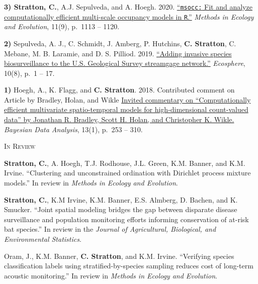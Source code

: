 \documentclass[a4paper]{article}
\newcommand{\subheader} [1] {
	{\hspace*{-9pt}\vspace*{6pt} \textsc{#1}}
	\vspace*{-6pt}
}
\begin{document}
\textbf{3) Stratton, C.}, A.J. Sepulveda, and A. Hoegh. 2020.
\href{https://doi.org/10.1111/2041-210X.13442}{``\texttt{msocc:} Fit and
analyze computationally efficient multi-scale occupancy models in
\texttt{R}.''} \textit{Methods in Ecology and Evolution}, 11(9), p.~1113
-- 1120. \vspace*{2mm}

\textbf{2)} Sepulveda, A. J., C. Schmidt, J. Amberg, P. Hutchins,
\textbf{C. Stratton}, C. Mebane, M. B. Laramie, and D. S. Pilliod. 2019.
\href{https://doi.org/10.1002/ecs2.2843}{``Adding invasive species
biosurveillance to the U.S. Geological Survey streamgage network.''}
\textit{Ecosphere}, 10(8), p.~1 -- 17. \vspace*{2mm}

\textbf{1)} Hoegh, A., K. Flagg, and \textbf{C. Stratton}. 2018.
Contributed comment on Article by Bradley, Holan, and Wikle
\href{https://eds.p.ebscohost.com/abstract?site=eds\&scope=site\&jrnl=19360975\&AN=138950462\&h=fupOc1pyeH8dv67mdPoRzhYvo96LS\%2bzCYNHIjAcMPojnVBydkua\%2fXFU6RanU78MDh8WNMlzPVI\%2fBxvaUiWvg\%2bw\%3d\%3d\&crl=c\&resultLocal=ErrCrlNoResults\&resultNs=Ehost\&crlhashurl=login.aspx\%3fdirect\%3dtrue\%26profile\%3dehost\%26scope\%3dsite\%26authtype\%3dcrawler\%26jrnl\%3d19360975\%26AN\%3d138950462}{Invited
commentary on ``Computationally efficient multivariate spatio-temporal
models for high-dimensional count-valued data'' by Jonathan R. Bradley,
Scott H. Holan, and Christopher K. Wikle.}
\textit{Bayesian Data Analysis}, 13(1), p.~253 -- 310. \vspace*{2mm}

\subheader{In Review}
\vspace*{2mm}

\textbf{Stratton, C.}, A. Hoegh, T.J. Rodhouse, J.L. Green, K.M. Banner,
and K.M. Irvine. ``Clustering and unconstrained ordination with
Dirichlet process mixture models.'' In review in
\textit{Methods in Ecology and Evolution}. \vspace*{2mm}

\textbf{Stratton, C.}, K.M Irvine, K.M. Banner, E.S. Almberg, D. Bachen,
and K. Smucker. ``Joint spatial modeling bridges the gap between
disparate disease surveillance and population monitoring efforts
informing conservation of at-risk bat species.'' In review in the
\textit{Journal of Agricultural, Biological, and Environmental Statistics}.
\vspace*{2mm}

Oram, J., K.M. Banner, \textbf{C. Stratton}, and K.M. Irvine.
``Verifying species classification labels using stratified-by-species
sampling reduces cost of long-term acoustic monitoring.'' In review in
\textit{Methods in Ecology and Evolution}. \vspace*{2mm}
\end{document}
